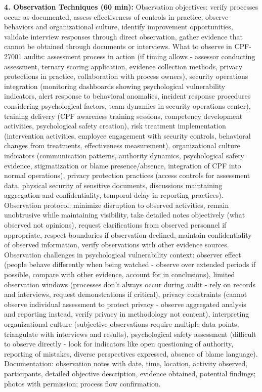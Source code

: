 \documentclass[11pt,a4paper]{article}
\begin{document}
\textbf{4. Observation Techniques (60 min):} Observation objectives: verify processes occur as documented, assess effectiveness of controls in practice, observe behaviors and organizational culture, identify improvement opportunities, validate interview responses through direct observation, gather evidence that cannot be obtained through documents or interviews. What to observe in CPF-27001 audits: assessment process in action (if timing allows - assessor conducting assessment, ternary scoring application, evidence collection methods, privacy protections in practice, collaboration with process owners), security operations integration (monitoring dashboards showing psychological vulnerability indicators, alert response to behavioral anomalies, incident response procedures considering psychological factors, team dynamics in security operations center), training delivery (CPF awareness training sessions, competency development activities, psychological safety creation), risk treatment implementation (intervention activities, employee engagement with security controls, behavioral changes from treatments, effectiveness measurement), organizational culture indicators (communication patterns, authority dynamics, psychological safety evidence, stigmatization or blame presence/absence, integration of CPF into normal operations), privacy protection practices (access controls for assessment data, physical security of sensitive documents, discussions maintaining aggregation and confidentiality, temporal delay in reporting practices). Observation protocol: minimize disruption to observed activities, remain unobtrusive while maintaining visibility, take detailed notes objectively (what observed not opinions), request clarifications from observed personnel if appropriate, respect boundaries if observation declined, maintain confidentiality of observed information, verify observations with other evidence sources. Observation challenges in psychological vulnerability context: observer effect (people behave differently when being watched - observe over extended periods if possible, compare with other evidence, account for in conclusions), limited observation windows (processes don't always occur during audit - rely on records and interviews, request demonstrations if critical), privacy constraints (cannot observe individual assessment to protect privacy - observe aggregated analysis and reporting instead, verify privacy in methodology not content), interpreting organizational culture (subjective observations require multiple data points, triangulate with interviews and results), psychological safety assessment (difficult to observe directly - look for indicators like open questioning of authority, reporting of mistakes, diverse perspectives expressed, absence of blame language). Documentation: observation notes with date, time, location, activity observed, participants, detailed objective description, evidence obtained, potential findings; photos with permission; process flow confirmation.
\end{document}
